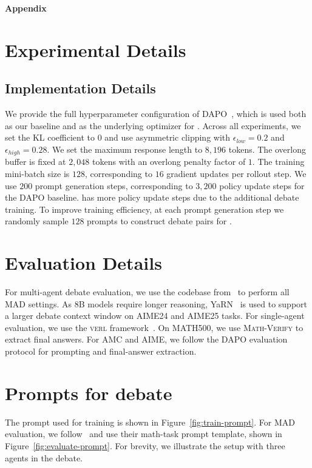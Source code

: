 \onecolumn
\begin{center}
    {\LARGE \bf Appendix}
\end{center}



\section{Experimental Details}
\subsection{Implementation Details}
We provide the full hyperparameter configuration of DAPO~\cite{yu2025dapo}, which is used both as our baseline and as the underlying optimizer for \SDRL{}. Across all experiments, we set the KL coefficient to $0$ and use asymmetric clipping with $\epsilon_{low}=0.2$ and $\epsilon_{high}=0.28$. We set the maximum response length to $8{,}196$ tokens. The overlong buffer is fixed at $2{,}048$ tokens with an overlong penalty factor of $1$. The training mini-batch size is $128$, corresponding to $16$ gradient updates per rollout step. We use $200$ prompt generation steps, corresponding to $3{,}200$ policy update steps for the DAPO baseline. \SDRL{} has more policy update steps due to the additional debate training. To improve training efficiency, at each prompt generation step we randomly sample $128$ prompts to construct debate pairs for \SDRL{}. 

\section{Evaluation Details}
For multi-agent debate evaluation, we use the codebase from~\citet{choi2025debate} to perform all MAD settings. As 8B models require longer reasoning, YaRN~\citep{peng2023yarn} is used to support a larger debate context window on AIME24 and AIME25 tasks. For single-agent evaluation, we use the \textsc{verl} framework~\cite{sheng2024hybridflow}. On MATH500, we use \textsc{Math-Verify} to extract final answers. For AMC and AIME, we follow the DAPO evaluation protocol for prompting and final-answer extraction. 

\section{Prompts for debate}
The prompt used for \SDRL{} training is shown in Figure~\ref{fig:train-prompt}. For MAD evaluation, we follow~\cite{choi2025debate} and use their math-task prompt template, shown in Figure~\ref{fig:evaluate-prompt}. For brevity, we illustrate the setup with three agents in the debate.

